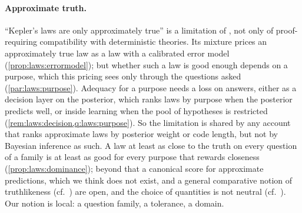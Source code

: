 \paragraph{Approximate truth.}\label{sec:limits:approx}``Kepler's laws are only approximately true'' is a limitation of \SAIabbr, not only of proof-requiring compatibility with deterministic theories. Its mixture prices an approximately true law as a law with a calibrated error model (\cref{prop:laws:errormodel}); but whether such a law is good enough depends on a purpose, which this pricing sees only through the questions asked (\cref{par:laws:purpose}). Adequacy for a purpose needs a loss on answers, either as a decision layer on the posterior, which ranks laws by purpose when the posterior predicts well, or inside learning when the pool of hypotheses is restricted (\cref{rem:laws:decision,q:laws:purpose}). So the limitation is shared by any account that ranks approximate laws by posterior weight or code length, but not by Bayesian inference as such. A law at least as close to the truth on every question of a family is at least as good for every purpose that rewards closeness (\cref{prop:laws:dominance}); beyond that a canonical score for approximate predictions, which we think does not exist, and a general comparative notion of truthlikeness (cf.\ \citealp{popper1963conjectures,miller1974popper,tichy1974popper,niiniluoto1987truthlikeness}) are open, and the choice of quantities is not neutral (cf.\ \citealp{miller1975accuracy}). Our notion is local: a question family, a tolerance, a domain.

